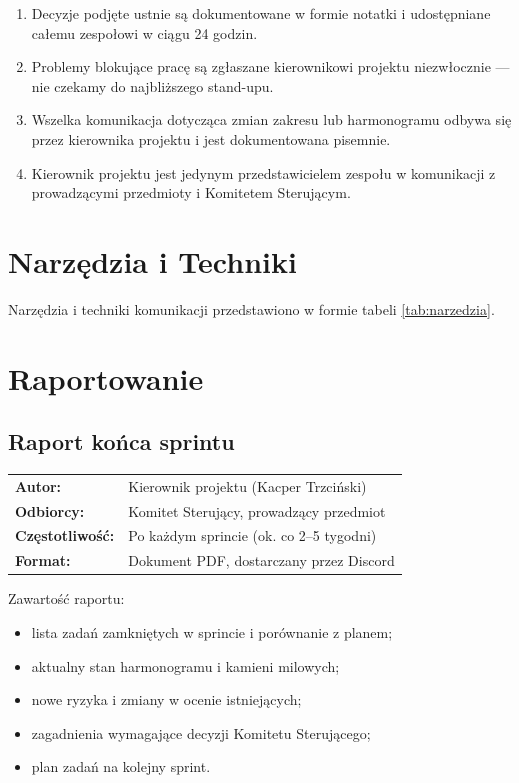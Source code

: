 \documentclass[11pt,a4paper]{article}
\begin{document}
\begin{enumerate}[noitemsep]
    \item Decyzje podjęte ustnie są dokumentowane w formie notatki i udostępniane całemu zespołowi w ciągu 24 godzin.
    \item Problemy blokujące pracę są zgłaszane kierownikowi projektu niezwłocznie --- nie czekamy do najbliższego stand-upu.
    \item Wszelka komunikacja dotycząca zmian zakresu lub harmonogramu odbywa się przez kierownika projektu i jest dokumentowana pisemnie.
    \item Kierownik projektu jest jedynym przedstawicielem zespołu w komunikacji z prowadzącymi przedmioty i Komitetem Sterującym.
\end{enumerate}

\section{Narzędzia i Techniki}
Narzędzia i techniki komunikacji przedstawiono w formie tabeli \ref{tab:narzedzia}. 

\section{Raportowanie}

\subsection{Raport końca sprintu}

\begin{tabular}{ll}
\textbf{Autor:}         & Kierownik projektu (Kacper Trzciński) \\
\textbf{Odbiorcy:}      & Komitet Sterujący, prowadzący przedmiot \\
\textbf{Częstotliwość:} & Po każdym sprincie (ok. co 2--5 tygodni) \\
\textbf{Format:}        & Dokument PDF, dostarczany przez Discord \\
\end{tabular}

\vspace{0.5em}
Zawartość raportu:
\begin{itemize}[noitemsep]
    \item lista zadań zamkniętych w sprincie i porównanie z planem;
    \item aktualny stan harmonogramu i kamieni milowych;
    \item nowe ryzyka i zmiany w ocenie istniejących;
    \item zagadnienia wymagające decyzji Komitetu Sterującego;
    \item plan zadań na kolejny sprint.
\end{itemize}
\end{document}
